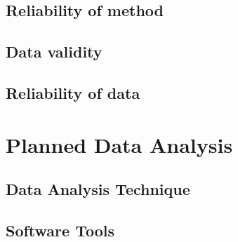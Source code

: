 
\subsection{Reliability of method}
\label{sec:reliabilityOfMethod}


\subsection{Data validity}
\label{sec:dataValidity}


\subsection{Reliability of data}
\label{sec:reliabilityOfData}



\section{Planned Data Analysis}
\label{sec:plannedDataAnalysis}


\subsection{Data Analysis Technique}
\label{sec:dataAnalysisTechnique}

\subsection{Software Tools}
\label{sec:softwareTools}


